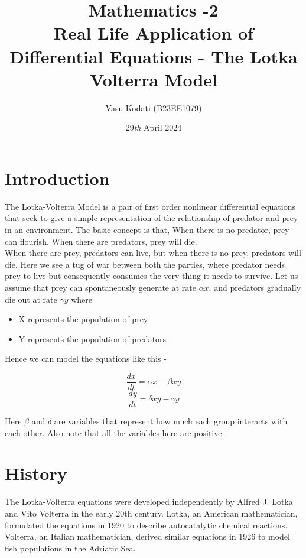 \documentclass{article}
\title{Mathematics -2 \\Real Life Application of Differential Equations - The Lotka Volterra Model}
\author{Vasu Kodati (B23EE1079)}
\date{29\textit{th} April 2024}
\begin{document}
\maketitle

\section{Introduction}

The Lotka-Volterra Model is a pair of first order nonlinear differential equations that seek to give a simple representation of the relationship of predator and prey in an environment. The basic concept is that, 
When there is no predator, prey can flourish. When there are predators, prey will die.\\
When there are prey, predators can live, but when there is no prey, predators will die. Here we see a tug of war between both the parties, where predator needs prey to live but consequently consumes the very thing it needs to survive. Let us assume that prey can spontaneously generate at rate $\alpha x$, and predators gradually die out at rate $\gamma y$ where 
\begin{itemize}
    \item  X represents the population of prey
    \item  Y represents the population of predators 
\end{itemize}

Hence we can model the equations like this - 

\begin{equation}
    \frac{dx}{dt} = \alpha x - \beta xy 
    \end{equation}
    \begin{equation}
    \frac{dy}{dt} = \delta xy - \gamma y 
    \end{equation}
   

 



Here $\beta$ and $\delta$ are variables that represent how much each group interacts with each other. Also note that all the variables here are positive.

\section{History}
The Lotka-Volterra equations were developed independently by Alfred J. Lotka and Vito Volterra in the early 20th century. Lotka, an American mathematician, formulated the equations in 1920 to describe autocatalytic chemical reactions. Volterra, an Italian mathematician, derived similar equations in 1926 to model fish populations in the Adriatic Sea. \newline
\end{document}
